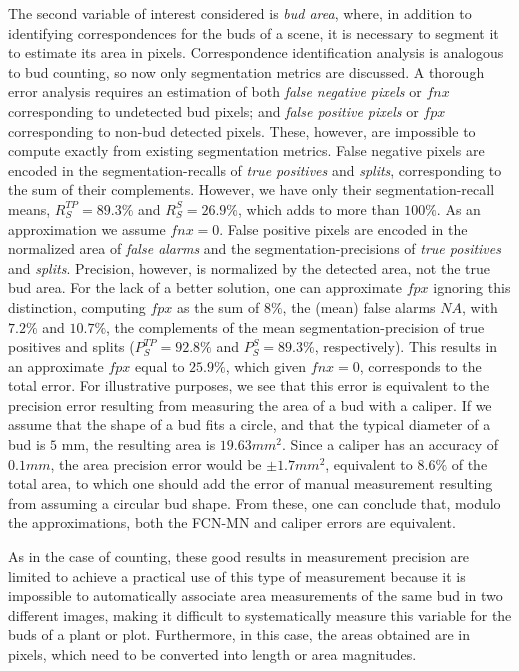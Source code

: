 \documentclass[a4paper,authoryear,review]{elsarticle}
\begin{document}
	
	The second variable of interest considered is \emph{bud area}, where, in addition to identifying correspondences for the buds of a scene, it is necessary to segment it to estimate its area in pixels. Correspondence identification analysis is analogous to bud counting, so now only segmentation metrics are discussed.
	A thorough error analysis requires an estimation of both \emph{false negative pixels} or $fnx$ corresponding to undetected bud pixels; and \emph{false positive pixels} or $fpx$ corresponding to non-bud detected pixels. 
	These, however, are impossible to compute exactly from existing segmentation metrics. 
	False negative pixels are encoded in the segmentation-recalls of \emph{true positives}  and \emph{splits}, corresponding to the sum of their complements. However, we have only their segmentation-recall means, $R_S^{TP} = 89.3\%$ and $R_S^{S} = 26.9\%$, which adds to more than $100\%$. As an approximation we assume $fnx=0$.
	False positive pixels are encoded in the normalized area of \emph{false alarms} and  the segmentation-precisions of \emph{true positives} and \emph{splits}. Precision, however, is normalized by the detected area, not the true bud area. For the lack of a better solution, one can approximate $fpx$ ignoring this distinction, computing $fpx$ as the sum of $8\%$, the (mean) false alarms $NA$, with $7.2\%$ and $10.7\%$, the complements of the mean segmentation-precision of  true positives and splits ($P_S^{TP}=92.8\%$ and $P_S^{S}=89.3\%$, respectively). This results in an approximate $fpx$ equal to $25.9\%$, which given $fnx=0$, corresponds to the total error. 
	For illustrative purposes, we see that this error is equivalent to the precision error resulting from measuring the area of a bud with a caliper. If we assume that the shape of a bud fits a circle, and that the typical diameter of a bud is $5$ mm, the resulting area is $19.63 mm^2$. Since a caliper has an accuracy of $0.1 mm$, the area precision error would be $\pm 1.7 mm^2$, equivalent to $8.6\%$ of the total area, to which one should add the error of manual measurement resulting from assuming a circular bud shape. From these, one can conclude that, modulo the approximations, both the FCN-MN and caliper errors are equivalent.
	
	As in the case of counting, these good results in measurement precision are limited to achieve a practical use of this type of measurement because it is impossible to automatically associate area measurements of the same bud in two different images, making it difficult to systematically measure this variable for the buds of a plant or plot. Furthermore, in this case, the areas obtained are in pixels, which need to be converted into length or area magnitudes.
	
\end{document}
